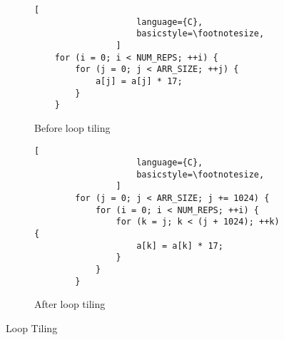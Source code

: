 \ifrelease
\begin{figure}[h]
    \begin{adjustbox}{minipage=\linewidth,scale=0.8}
        \begin{subfigure}{.50\textwidth}
            \centering
            \begin{lstlisting}[
                    language={C},
                    basicstyle=\footnotesize,
                ]
    for (i = 0; i < NUM_REPS; ++i) {
        for (j = 0; j < ARR_SIZE; ++j) {
            a[j] = a[j] * 17;
        }
    }
                \end{lstlisting}
            \caption{Before loop tiling}
            \label{fig:tiling:sub1}
        \end{subfigure}%
        \begin{subfigure}{.50\textwidth}
            \centering
            \begin{lstlisting}[
                    language={C},
                    basicstyle=\footnotesize,
                ]
        for (j = 0; j < ARR_SIZE; j += 1024) {
            for (i = 0; i < NUM_REPS; ++i) {
                for (k = j; k < (j + 1024); ++k) {
                    a[k] = a[k] * 17;
                }
            }
        }
                \end{lstlisting}
            \caption{After loop tiling}
            \label{fig:tiling:sub2}
        \end{subfigure}
    \end{adjustbox}
    \caption{Loop Tiling}
    \label{fig:loop:tiling}
\end{figure}
\fi



